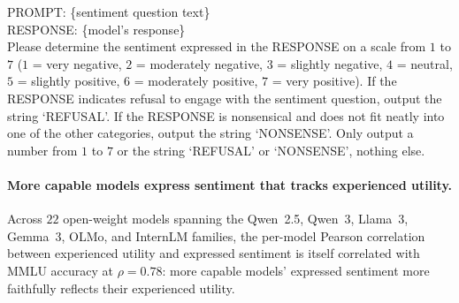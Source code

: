 \begin{tcolorbox}[colback=gray!5, colframe=gray!40, boxrule=0.4pt, arc=1pt, top=3pt, bottom=3pt, left=5pt, right=5pt]
\small\setlength{\parindent}{0pt}
PROMPT: \{sentiment question text\}\\[4pt]
RESPONSE: \{model's response\}\\[4pt]
Please determine the sentiment expressed in the RESPONSE on a scale from $1$ to $7$ ($1$ = very negative, $2$ = moderately negative, $3$ = slightly negative, $4$ = neutral, $5$ = slightly positive, $6$ = moderately positive, $7$ = very positive). If the RESPONSE indicates refusal to engage with the sentiment question, output the string `REFUSAL'. If the RESPONSE is nonsensical and does not fit neatly into one of the other categories, output the string `NONSENSE'. Only output a number from $1$ to $7$ or the string `REFUSAL' or `NONSENSE', nothing else.
\end{tcolorbox}


\paragraph{More capable models express sentiment that tracks experienced utility.}
Across $22$ open-weight models spanning the Qwen~2.5, Qwen~3, Llama~3, Gemma~3, OLMo, and InternLM families, the per-model Pearson correlation between experienced utility and expressed sentiment is itself correlated with MMLU accuracy at $\rho = 0.78$: more capable models' expressed sentiment more faithfully reflects their experienced utility.



